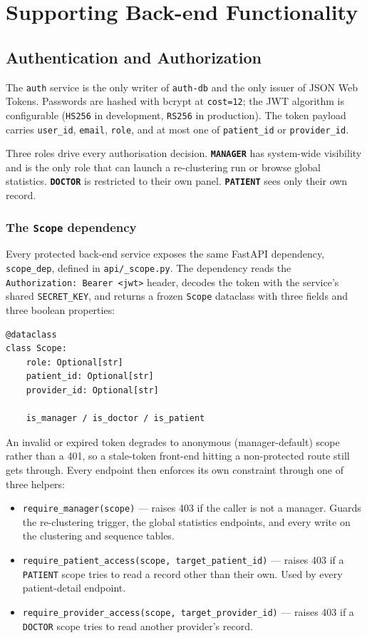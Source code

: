 \section{Supporting Back-end Functionality}

\subsection{Authentication and Authorization}
\label{subsec:authz}

The \texttt{auth} service is the only writer of \texttt{auth-db} and the only issuer of JSON Web Tokens. Passwords are hashed with bcrypt at \texttt{cost=12}; the JWT algorithm is configurable (\texttt{HS256} in development, \texttt{RS256} in production). The token payload carries \texttt{user\_id}, \texttt{email}, \texttt{role}, and at most one of \texttt{patient\_id} or \texttt{provider\_id}.

Three roles drive every authorisation decision. \textbf{\texttt{MANAGER}} has system-wide visibility and is the only role that can launch a re-clustering run or browse global statistics. \textbf{\texttt{DOCTOR}} is restricted to their own panel. \textbf{\texttt{PATIENT}} sees only their own record.

\subsubsection*{The \texttt{Scope} dependency}

Every protected back-end service exposes the same FastAPI dependency, \texttt{scope\_dep}, defined in \texttt{api/\_scope.py}. The dependency reads the \texttt{Authorization: Bearer <jwt>} header, decodes the token with the service's shared \texttt{SECRET\_KEY}, and returns a frozen \texttt{Scope} dataclass with three fields and three boolean properties:
\begin{verbatim}
@dataclass
class Scope:
    role: Optional[str]
    patient_id: Optional[str]
    provider_id: Optional[str]

    is_manager / is_doctor / is_patient
\end{verbatim}
An invalid or expired token degrades to anonymous (manager-default) scope rather than a 401, so a stale-token front-end hitting a non-protected route still gets through. Every endpoint then enforces its own constraint through one of three helpers:
\begin{itemize}
    \item \texttt{require\_manager(scope)} --- raises 403 if the caller is not a manager. Guards the re-clustering trigger, the global statistics endpoints, and every write on the clustering and sequence tables.
    \item \texttt{require\_patient\_access(scope, target\_patient\_id)} --- raises 403 if a \texttt{PATIENT} scope tries to read a record other than their own. Used by every patient-detail endpoint.
    \item \texttt{require\_provider\_access(scope, target\_provider\_id)} --- raises 403 if a \texttt{DOCTOR} scope tries to read another provider's record.
\end{itemize}

